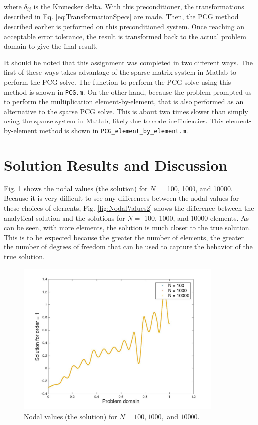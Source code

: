 \documentclass[10pt]{article}
\begin{document}
where \(\delta_{ij}\) is the Kronecker delta. With this preconditioner, the transformations described in Eq. \eqref{eq:TransformationSpecs} are made. Then, the PCG method described earlier is performed on this preconditioned system. Once reaching an acceptable error tolerance, the result is transformed back to the actual problem domain to give the final result.

It should be noted that this assignment was completed in two different ways. The first of these ways takes advantage of the sparse matrix system in Matlab to perform the PCG solve. The function to perform the PCG solve using this method is shown in \texttt{PCG.m}. On the other hand, because the problem prompted us to perform the multiplication element-by-element, that is also performed as an alternative to the sparse PCG solve. This is about two times slower than simply using the sparse system in Matlab, likely due to code inefficiencies. This element-by-element method is shown in \texttt{PCG\_element\_by\_element.m}.

\section{Solution Results and Discussion}

Fig. \ref{fig:NodalValues} shows the nodal values (the solution) for \(N=\) 100, 1000, and 10000. Because it is very difficult to see any differences between the nodal values for these choices of elements, Fig. \ref{fig:NodalValues2} shows the difference between the analytical solution and the solutions for \(N=\) 100, 1000, and 10000 elements. As can be seen, with more elements, the solution is much closer to the true solution. This is to be expected because the greater the number of elements, the greater the number of degrees of freedom that can be used to capture the behavior of the true solution. 

\begin{figure}[H]
  \centering
  \includegraphics[width=10cm]{Nplot.jpg}
  \caption{Nodal values (the solution) for \(N=100, 1000, \) and \(10000\).}
  \label{fig:NodalValues}
\end{figure}
\end{document}
